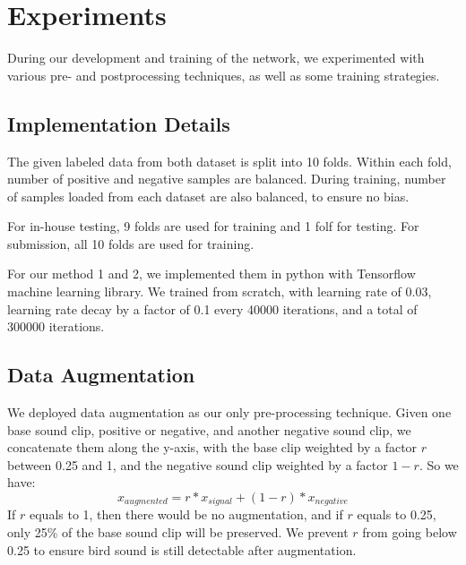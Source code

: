 \documentclass[10pt,twocolumn,letterpaper]{article}
\begin{document}
\section{Experiments}

During our development and training of the network, we experimented with
various pre- and postprocessing techniques, as well as some training
strategies.

\subsection{Implementation Details}

The given labeled data from both dataset is split into 10 folds. Within
each fold, number of positive and negative samples are balanced. During
training, number of samples loaded from each dataset are also balanced, to
ensure no bias.

For in-house testing, 9 folds are used for training and 1 folf for testing.
For submission, all 10 folds are used for training.

For our method 1 and 2, we implemented them in python with Tensorflow
machine learning library. We trained from scratch, with learning rate of
0.03, learning rate decay by a factor of 0.1 every 40000 iterations, and a
total of 300000 iterations.

\subsection{Data Augmentation}

We deployed data augmentation as our only pre-processing technique. Given
one base sound clip, positive or negative, and another negative sound clip,
we concatenate them along the y-axis, with the base clip weighted by a
factor \(r\) between 0.25 and 1, and the negative sound clip weighted by a
factor \(1-r\). So we have:
\begin{equation}
	x_{augmented}=r*x_{signal} + (1-r)*x_{negative}
\end{equation}
If \(r\) equals to 1, then there would be no augmentation, and if \(r\)
equals to 0.25, only 25\% of the base sound clip will be preserved. We
prevent \(r\) from going below 0.25 to ensure bird sound is still
detectable after augmentation.
\end{document}
